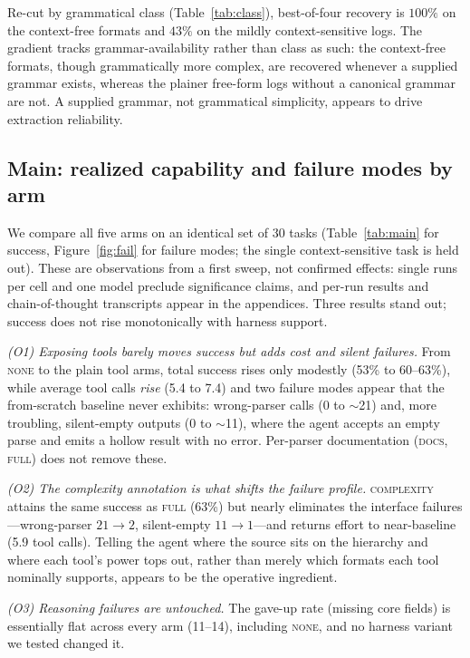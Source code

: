\documentclass{article}
\begin{document}
Re-cut by grammatical class (Table~\ref{tab:class}), best-of-four recovery is \(100\%\) on
the context-free formats and \(43\%\) on the mildly context-sensitive logs. The gradient
tracks grammar-availability rather than class as such: the context-free formats, though
grammatically more complex, are recovered whenever a supplied grammar exists, whereas the
plainer free-form logs without a canonical grammar are not. A supplied grammar, not
grammatical simplicity, appears to drive extraction reliability.

\subsection{Main: realized capability and failure modes by arm}
\label{sec:main}

We compare all five arms on an identical set of 30 tasks (Table~\ref{tab:main} for
success, Figure~\ref{fig:fail} for failure modes; the single context-sensitive task is
held out). These are observations from a first sweep, not confirmed effects: single runs
per cell and one model preclude significance claims, and per-run results and
chain-of-thought transcripts appear in the appendices. Three results stand out; success
does not rise monotonically with harness support.

\emph{(O1) Exposing tools barely moves success but adds cost and silent failures.} From
\textsc{none} to the plain tool arms, total success rises only modestly (53\% to
60--63\%), while average tool calls \emph{rise} (5.4 to 7.4) and two failure modes appear
that the from-scratch baseline never exhibits: wrong-parser calls (0 to $\sim$21) and,
more troubling, silent-empty outputs (0 to $\sim$11), where the agent accepts an empty
parse and emits a hollow result with no error. Per-parser documentation
(\textsc{docs}, \textsc{full}) does not remove these.

\emph{(O2) The complexity annotation is what shifts the failure profile.} \textsc{complexity}
attains the same success as \textsc{full} (63\%) but nearly eliminates the interface
failures---wrong-parser $21\to2$, silent-empty $11\to1$---and returns effort to
near-baseline (5.9 tool calls). Telling the agent where the source sits on the hierarchy
and where each tool's power tops out, rather than merely which formats each tool
nominally supports, appears to be the operative ingredient.

\emph{(O3) Reasoning failures are untouched.} The gave-up rate (missing core fields) is
essentially flat across every arm (11--14), including \textsc{none}, and no harness
variant we tested changed it.
\end{document}
